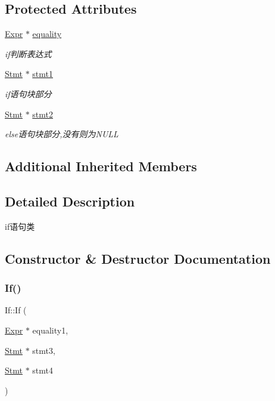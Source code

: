 \subsection*{Protected Attributes}
\begin{DoxyCompactItemize}
\item 
\mbox{\label{class_if_a84f2d73109cd8030fcc244ef741b5803}} 
\hyperlink{class_expr}{Expr} $\ast$ \hyperlink{class_if_a84f2d73109cd8030fcc244ef741b5803}{equality}
\begin{DoxyCompactList}\small\item\em if判断表达式 \end{DoxyCompactList}\item 
\mbox{\label{class_if_a3ece7870e5d5b11dd42457e22af00a72}} 
\hyperlink{class_stmt}{Stmt} $\ast$ \hyperlink{class_if_a3ece7870e5d5b11dd42457e22af00a72}{stmt1}
\begin{DoxyCompactList}\small\item\em if语句块部分 \end{DoxyCompactList}\item 
\mbox{\label{class_if_aaf8a095b5a986832928ebdcdb263d41c}} 
\hyperlink{class_stmt}{Stmt} $\ast$ \hyperlink{class_if_aaf8a095b5a986832928ebdcdb263d41c}{stmt2}
\begin{DoxyCompactList}\small\item\em else语句块部分,没有则为\+N\+U\+LL \end{DoxyCompactList}\end{DoxyCompactItemize}
\subsection*{Additional Inherited Members}


\subsection{Detailed Description}
if语句类 

\subsection{Constructor \& Destructor Documentation}
\mbox{\label{class_if_a398387169436db838e9935b985a8f4a9}} 
\subsubsection{\texorpdfstring{If()}{If()}}
{\footnotesize\ttfamily If\+::\+If (\begin{DoxyParamCaption}\item[{\hyperlink{class_expr}{Expr} $\ast$}]{equality1,  }\item[{\hyperlink{class_stmt}{Stmt} $\ast$}]{stmt3,  }\item[{\hyperlink{class_stmt}{Stmt} $\ast$}]{stmt4 }\end{DoxyParamCaption})}


